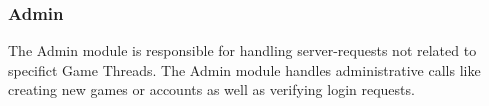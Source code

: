 \subsubsection{Admin}\label{subsec:admindesign}
The Admin module is responsible for handling server-requests not related to specifict Game Threads. The Admin module handles administrative calls like creating new games or accounts as well as verifying login requests. 


